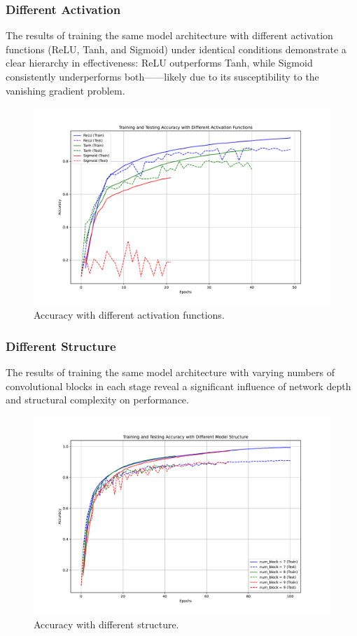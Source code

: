 \documentclass{article}
\begin{document}
\subsubsection{Different Activation}

The results of training the same model architecture with different activation functions (ReLU, Tanh, and Sigmoid) under identical conditions demonstrate a clear hierarchy in effectiveness: ReLU outperforms Tanh, while Sigmoid consistently underperforms both——likely due to its susceptibility to the vanishing gradient problem.

\begin{figure}[H]
  \centering
  \includegraphics[width=0.7\linewidth]{figures/accuracy_different_activation.pdf}
  \caption{Accuracy with different activation functions.}
  \label{fig:accuracy_different_activation}
\end{figure}

\subsubsection{Different Structure}

The results of training the same model architecture with varying numbers of convolutional blocks in each stage reveal a significant influence of network depth and structural complexity on performance.

\begin{figure}[H]
  \centering
  \includegraphics[width=0.7\linewidth]{figures/accuracy_different_structure.pdf}
  \caption{Accuracy with different structure.}
  \label{fig:accuracy_different_structure}
\end{figure}
\end{document}
